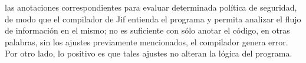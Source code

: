 las anotaciones correspondientes para evaluar determinada política de seguridad,
de modo que el compilador de Jif entienda el programa y permita analizar el
flujo de información en el mismo; no es suficiente con sólo anotar el código, en
otras palabras, sin los ajustes previamente mencionados, el compilador genera
error. Por otro lado, lo positivo es que tales ajustes no alteran la lógica del
programa.
























